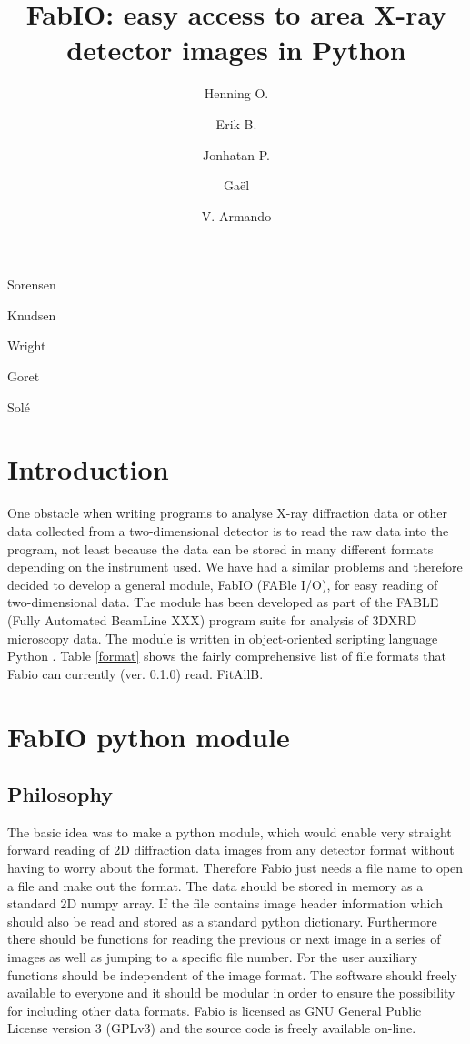 \documentclass{iucr}
\begin{document}
\title{FabIO: easy access to area X-ray detector images in Python}
    \author[a]{Henning O.}{S\/orensen}
    \author[a]{Erik B.}{Knudsen}
    \author[b]{Jonhatan P.}{Wright}
	\author[b]{Ga\"el}{Goret}
	\author[b]{V. Armando}{Sol\'e}
	

\maketitle

\section{Introduction}

One obstacle when writing programs to analyse X-ray diffraction data or other
data collected from a two-dimensional detector is to read the raw data into the
program, not least because the data can be stored in many different formats
depending on the instrument used. 
We have had a similar problems and therefore decided to develop a general module, 
FabIO (FABle I/O), for easy reading of two-dimensional data. 
The module has been developed as part of the FABLE (Fully Automated BeamLine 
XXX) program suite for analysis of 3DXRD microscopy
data\cite{3dxrd}. The module is written in object-oriented scripting language
Python\cite{python} . Table \ref{format} shows the fairly comprehensive list of
file formats that Fabio can currently (ver. 0.1.0) read. FitAllB\cite{fitallb}.


\section{FabIO python module} 

\subsection{Philosophy}

The basic idea was to make a python module, which would enable very straight
forward reading of 2D diffraction  data images from any detector format
without having to worry about the format.
Therefore Fabio just needs a file name to open a file and make out the format. 
The data should be stored in memory as a standard 2D numpy array\cite{numpy}.
If the file contains image header information which should also be read and 
stored as a standard python dictionary. 
Furthermore there should be functions for reading the previous or next image 
in a series of images as well as jumping to a specific file number. 
For the user auxiliary functions should be independent of the image format.
The software should freely available to everyone and it should be modular in 
order to ensure the possibility for including other data formats. 
Fabio is licensed as GNU General Public License version 3 (GPLv3) 
and the source code is freely available on-line\cite{fabio}.
\end{document}
